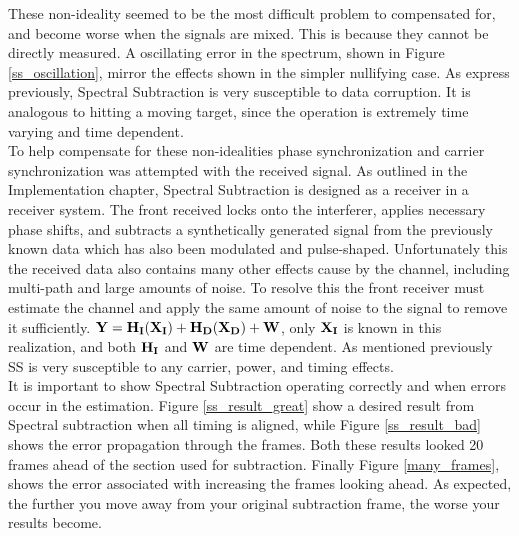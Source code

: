 These non-ideality seemed to be the most difficult problem to compensated for, and become worse when the signals are mixed.  This is because they cannot be directly measured.  A oscillating error in the spectrum, shown in Figure \ref{ss_oscillation}, mirror the effects shown in the simpler nullifying case.  As express previously, Spectral Subtraction is very susceptible to data corruption.  It is analogous to hitting a moving target, since the operation is extremely time varying and time dependent.\\  

To help compensate for these non-idealities phase synchronization and carrier synchronization was attempted with the received signal.  As outlined in the Implementation chapter, Spectral Subtraction is designed as a receiver in a receiver system.  The front received locks onto the interferer, applies necessary phase shifts, and subtracts a synthetically generated signal from the previously known data which has also been modulated and pulse-shaped.  Unfortunately this the received data also contains many other effects cause by the channel, including multi-path and large amounts of noise.  To resolve this the front receiver must estimate the channel and apply the same amount of noise to the signal to remove it sufficiently.  \( \bf{Y}=H_{I}(X_{I})+H_{D}(X_{D})+W \), only \(\bf{X_{I}}\) is known in this realization, and both \(\bf{H_{I}}\) and \(\bf{W}\) are time dependent.  As mentioned previously SS is very susceptible to any carrier, power, and timing effects.\\


It is important to show Spectral Subtraction operating correctly and when errors occur in the estimation.  Figure \ref{ss_result_great} show a desired result from Spectral subtraction when all timing is aligned, while Figure \ref{ss_result_bad} shows the error propagation through the frames.  Both these results looked 20 frames ahead of the section used for subtraction.  Finally Figure \ref{many_frames}, shows the error associated with increasing the frames looking ahead.  As expected, the further you move away from your original subtraction frame, the worse your results become.\\


